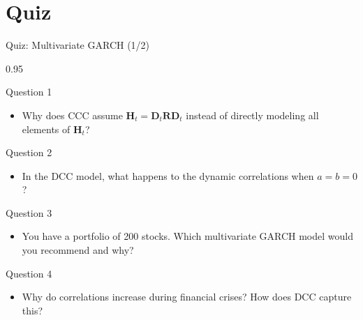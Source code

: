 \documentclass[9pt, aspectratio=169, t]{beamer}
\begin{document}
\section{Quiz}

\begin{frame}{Quiz: Multivariate GARCH (1/2)}
    \begin{cminipage}{0.95\textwidth}
    \vspace{-2mm}
    {\footnotesize
    \begin{block}{Question 1}
        \begin{itemize}\setlength{\itemsep}{0pt}
            \item Why does CCC assume $\mathbf{H}_t = \mathbf{D}_t\mathbf{R}\mathbf{D}_t$ instead of directly modeling all elements of $\mathbf{H}_t$?
        \end{itemize}
    \end{block}
    \vspace{-2mm}
    \begin{block}{Question 2}
        \begin{itemize}\setlength{\itemsep}{0pt}
            \item In the DCC model, what happens to the dynamic correlations when $a = b = 0$?
        \end{itemize}
    \end{block}
    \vspace{-2mm}
    \begin{block}{Question 3}
        \begin{itemize}\setlength{\itemsep}{0pt}
            \item You have a portfolio of 200 stocks. Which multivariate GARCH model would you recommend and why?
        \end{itemize}
    \end{block}
    \vspace{-2mm}
    \begin{block}{Question 4}
        \begin{itemize}\setlength{\itemsep}{0pt}
            \item Why do correlations increase during financial crises? How does DCC capture this?
        \end{itemize}
    \end{block}
    }
    \end{cminipage}
\end{frame}
\end{document}
